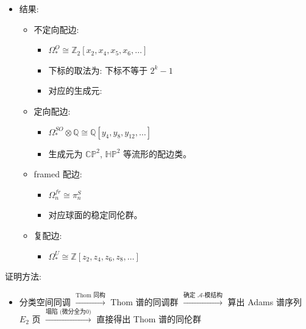 \documentclass[
]{ctexart}
\providecommand{\tightlist}{%
  \setlength{\itemsep}{0pt}\setlength{\parskip}{0pt}}
\begin{document}
\begin{itemize}
\tightlist
\item
  结果:

  \begin{itemize}
  \tightlist
  \item
    不定向配边:

    \begin{itemize}
    \tightlist
    \item
      \(\Omega^O_* \cong \mathbb{Z}_2[x_2, x_4, x_5, x_6, \dots]\)
    \item
      下标的取法为: 下标不等于 \(2^k-1\)
    \item
      对应的生成元:
    \end{itemize}
  \item
    定向配边:

    \begin{itemize}
    \tightlist
    \item
      \(\Omega_*^{SO} \otimes \mathbb{Q} \cong \mathbb{Q}[y_4, y_8, y_{12}, \dots]\)
    \item
      生成元为 \(\mathbb{CP}^2\), \(\mathbb{HP}^2\) 等流形的配边类。
    \end{itemize}
  \item
    framed 配边:

    \begin{itemize}
    \tightlist
    \item
      \(\Omega_n^{fr} \cong \pi_n^S\)
    \item
      对应球面的稳定同伦群。
    \end{itemize}
  \item
    复配边:

    \begin{itemize}
    \tightlist
    \item
      \(\Omega_*^U \cong \mathbb{Z}[z_2, z_4, z_6, z_8, \dots]\)
    \end{itemize}
  \end{itemize}
\end{itemize}

证明方法:

\begin{itemize}
\tightlist
\item
  分类空间同调 \(\xrightarrow{\text{Thom 同构}}\) Thom 谱的同调群
  \(\xrightarrow{\text{确定 } \mathcal{A}\text{-模结构}}\) 算出 Adams
  谱序列 \(E_2\) 页 \(\xrightarrow{\text{塌陷 (微分全为0)}}\) 直接得出
  Thom 谱的同伦群
\end{itemize}
\end{document}
